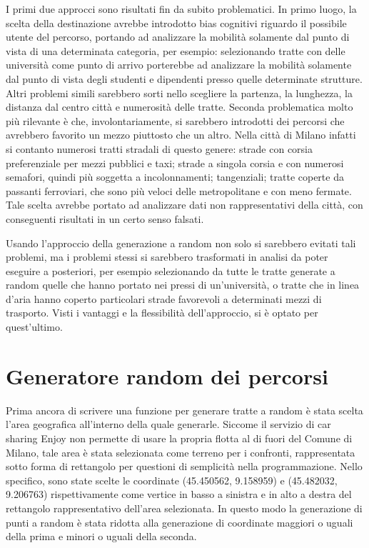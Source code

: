 I primi due approcci sono risultati fin da subito problematici. In primo luogo, la scelta della destinazione avrebbe introdotto bias cognitivi riguardo il possibile utente del percorso, portando ad analizzare la mobilità solamente dal punto di vista di una determinata categoria, per esempio: selezionando tratte con delle università come punto di arrivo porterebbe ad analizzare la mobilità solamente dal punto di vista degli studenti e dipendenti presso quelle determinate strutture. Altri problemi simili sarebbero sorti nello scegliere la partenza, la lunghezza, la distanza dal centro città e numerosità delle tratte. Seconda problematica molto più rilevante è che, involontariamente, si sarebbero introdotti dei percorsi che avrebbero favorito un mezzo piuttosto che un altro. Nella città di Milano infatti si contanto numerosi tratti stradali di questo genere: strade con corsia preferenziale per mezzi pubblici e taxi; strade a singola corsia e con numerosi semafori, quindi più soggetta a incolonnamenti; tangenziali; tratte coperte da passanti ferroviari, che sono più veloci delle metropolitane e con meno fermate. Tale scelta avrebbe portato ad analizzare dati non rappresentativi della città, con conseguenti risultati in un certo senso falsati.

Usando l'approccio della generazione a random non solo si sarebbero evitati tali problemi, ma i problemi stessi si sarebbero trasformati in analisi da poter eseguire a posteriori, per esempio selezionando da tutte le tratte generate a random quelle che hanno portato nei pressi di un'università, o tratte che in linea d'aria hanno coperto particolari strade favorevoli a determinati mezzi di trasporto. Visti i vantaggi e la flessibilità dell'approccio, si è optato per quest'ultimo.

\section{Generatore random dei percorsi}

Prima ancora di scrivere una funzione per generare tratte a random è stata scelta l'area geografica all'interno della quale generarle. Siccome il servizio di car sharing Enjoy non permette di usare la propria flotta al di fuori del Comune di Milano, tale area è stata selezionata come terreno per i confronti, rappresentata sotto forma di rettangolo per questioni di semplicità nella programmazione. Nello specifico, sono state scelte le coordinate (45.450562\textdegree, 9.158959\textdegree) e (45.482032\textdegree, 9.206763\textdegree) rispettivamente come vertice in basso a sinistra e in alto a destra del rettangolo rappresentativo dell'area selezionata. In questo modo la generazione di punti a random è stata ridotta alla generazione di coordinate maggiori o uguali della prima e minori o uguali della seconda.

